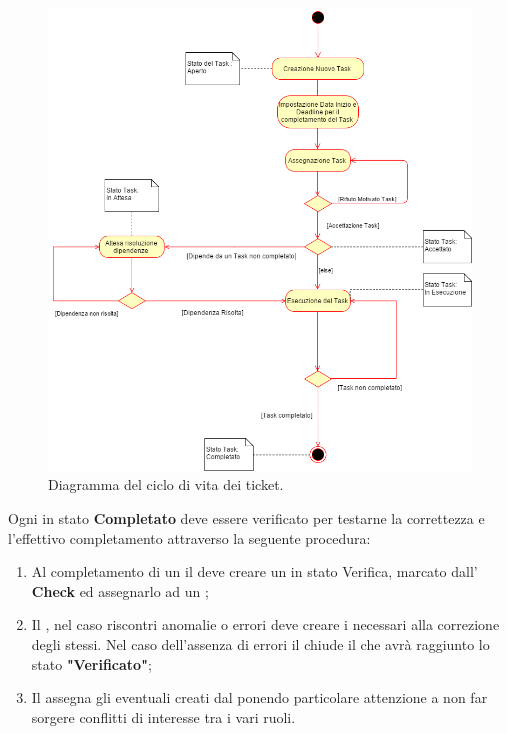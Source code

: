 \documentclass[12pt,a4paper]{article}
\begin{document}
\begin{center}
	\begin{figure}[H]
		\centering
		\label{f1-TicketCicloVita}
		\includegraphics[scale=0.6]{TicketCicloVita.png}
		\caption{Diagramma del ciclo di vita dei ticket.}
	\end{figure}
\end{center}


\label{ticketVerifica}
Ogni \textit{} in stato \textbf{Completato} deve essere verificato per testarne la correttezza e l'effettivo completamento attraverso la seguente procedura:

\begin{enumerate}
	\item Al completamento di un \textit{} il \PM{} deve creare un \textit{} in stato Verifica, marcato dall' \textbf{Check} ed assegnarlo ad un \VR{};
	\item Il \VR{}, nel caso riscontri anomalie o errori deve creare i \textit{} necessari alla correzione degli stessi. Nel caso dell'assenza di errori il \VR{} chiude il \textit{} che avrà raggiunto lo stato \textbf{"Verificato"};
	\item Il \PM{} assegna gli eventuali \textit{} creati dal \VR{} ponendo particolare attenzione a non far sorgere conflitti di interesse tra i vari ruoli.
\end{enumerate}
\end{document}
